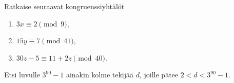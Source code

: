 \documentclass[11pt,a4paper]{amsart}
\begin{document}
\begin{exercise}
  Ratkaise seuraavat kongruenssiyhtälöt
  \begin{enumerate}[label=(\alph*), nosep]
    \item \(3x \equiv 2 \pmod{9}\),
    \item \(15y \equiv 7 \pmod{41}\),
    \item \(30z - 5 \equiv 11 + 2z \pmod{40}\).
  \end{enumerate}
\end{exercise}

\begin{exercise}
  Etsi luvulle \(3^{90} - 1\) ainakin kolme tekijää \(d\), joille pätee
  \(2 < d < 3^{90} - 1\).
\end{exercise}
\end{document}
